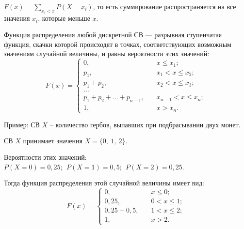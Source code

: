 \documentclass[a4paper]{article}
\newcommand{\sleq}{\leqslant}
\begin{document}
                    $F(x) = \sum\limits_{x_i < x} P(X = x_i)$, то есть суммирование распространяется на все значения $x_i$, которые меньше $x$.

                    Функция распределения любой дискретной СВ --- разрывная ступенчатая функция, скачки которой происходят в точках, соответствующих возможным значениям случайной величины, и равны вероятности этих значений:
                    \begin{equation*}
                        F(x) = 
                        \begin{cases}
                            0 , \quad & x \sleq x_1 ; \\[1.0ex]
                            p_1 , \quad & x_1 < x \sleq x_2 ; \\[1.0ex]
                            p_1 + p_2 , \quad & x_2 < x \sleq x_3 ; \\[1.0ex]
                            \ldots \\[1.0ex]
                            p_1 + p_2 + \ldots + p_{n - 1} , \quad
                                & x_{n - 1} < x \sleq x_n ; \\[1.0ex]
                            1 , \quad & x > x_n .
                        \end{cases}
                    \end{equation*}

                    Пример: СВ $X$ – количество гербов, выпавших при подбрасывании двух монет.
                    
                    СВ $X$ принимает значения $X = \{ 0, \: 1, \: 2 \}$.
                    
                    Вероятности этих значений: \newline
                    $P(X = 0) = 0,25 ; \:\: P(X = 1) = 0,5 ; \:\: P(X = 2) = 0,25$.
                    
                    Тогда функция распределения этой случайной величины имеет вид:
                    \begin{equation*}
                        F(x) = 
                        \begin{cases}
                            0 , \quad & x \sleq 0 ; \\[1.0ex]
                            0,25 , \quad & 0 < x \sleq 1 ; \\[1.0ex]
                            0,25 + 0,5 , \quad & 1 < x \sleq 2 ; \\[1.0ex]
                            1 , \quad & x > 2 .
                        \end{cases}
                    \end{equation*}
\end{document}
